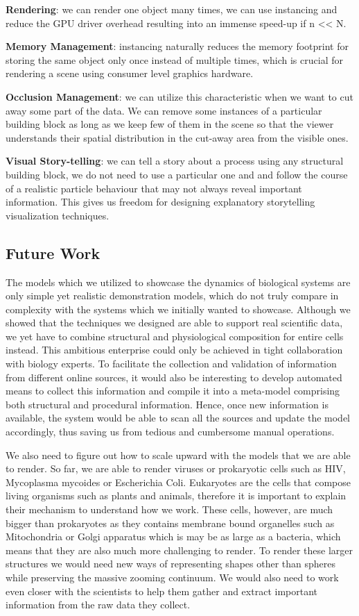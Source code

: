\textbf{Rendering}: we can render one object many times, we can use instancing and reduce the GPU driver overhead resulting into an immense speed-up if n << N.

\textbf{Memory Management}: instancing naturally reduces the memory footprint for storing the same object only once instead of multiple times, which is crucial for rendering a scene using consumer level graphics hardware.

\textbf{Occlusion Management}: we can utilize this characteristic when we want to cut away some part of the data. 
We can remove some instances of a particular building block as long as we keep few of them in the scene so that the viewer understands their spatial distribution in the cut-away area from the visible ones.

\textbf{Visual Story-telling}: we can tell a story about a process using any structural building block, we do not need to use a particular one and and follow the course of a realistic particle behaviour that may not always reveal important information.
This gives us freedom for designing explanatory storytelling visualization techniques.

\subsection{Future Work}

The models which we utilized to showcase the dynamics of biological systems are only simple yet realistic demonstration models, which do not truly compare in complexity with the systems which we initially wanted to showcase.
Although we showed that the techniques we designed are able to support real scientific data, we yet have to combine structural and physiological composition for entire cells instead.
This ambitious enterprise could only be achieved in tight collaboration with biology experts.
To facilitate the collection and validation of information from different online sources, it would also be interesting to develop automated means to collect this information and compile it into a meta-model comprising both structural and procedural information.
Hence, once new information is available, the system would be able to scan all the sources and update the model accordingly, thus saving us from tedious and cumbersome manual operations.

We also need to figure out how to scale upward with the models that we are able to render.
So far, we are able to render viruses or prokaryotic cells such as HIV, Mycoplasma mycoides or Escherichia Coli. 
Eukaryotes are the cells that compose living organisms such as plants and animals, therefore it is important to explain their mechanism to understand how we work.
These cells, however, are much bigger than prokaryotes as they contains membrane bound organelles such as Mitochondria or Golgi apparatus which is may be as large as a bacteria, which means that they are also much more challenging to render.
To render these larger structures we would need new ways of representing shapes other than spheres while preserving the massive zooming continuum.
We would also need to work even closer with the scientists to help them gather and extract important information from the raw data they collect.

